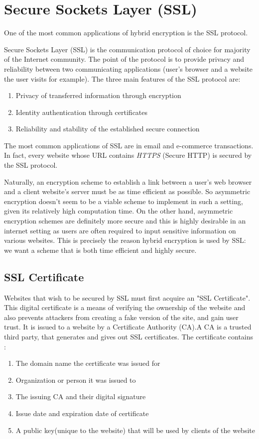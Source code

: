\section{Secure Sockets Layer (SSL)}
One of the most common applications of hybrid encryption is the SSL protocol.

\cite{mckinley}
Secure Sockets Layer (SSL) is the communication protocol of choice for majority of the Internet community. The point of the protocol is to provide privacy and reliability between two communicating applications (user's browser and a website the user visits for example). The three main features of the SSL protocol are:

\begin{enumerate}
    \item Privacy of transferred information through encryption
    \item Identity authentication through certificates
    \item Reliability and stability of the established secure connection
\end{enumerate}

The most common applications of SSL are in email and e-commerce transactions. In fact, every website whose URL contains \emph{HTTPS} (Secure HTTP) is secured by the SSL protocol.

Naturally, an encryption scheme to establish a link between a user's web browser and a client website's server must be as time efficient as possible. So asymmetric encryption doesn't seem to be a viable scheme to implement in such a setting, given its relatively high computation time. On the other hand, asymmetric encryption schemes are definitely more secure and this is highly desirable in an internet setting as users are often required to input sensitive information on various websites. This is precisely the reason hybrid encryption is used by SSL: we want a scheme that is both time efficient and highly secure.

\subsection{SSL Certificate} \cite{cloudflare_certificate}
Websites that wish to be secured by SSL must first acquire an "SSL Certificate". This digital certificate is a means of verifying the ownership of the website and also prevents attackers from creating a fake version of the site, and gain user trust. It is issued to a website by a Certificate Authority (CA).A CA is a trusted third party, that generates and gives out SSL certificates. The certificate contains :
\begin{enumerate}
    \item The domain name the certificate was issued for
    \item Organization or person it was issued to
    \item The issuing CA and their digital signature
    \item Issue date and expiration date of certificate
    \item A public key(unique to the website) that will be used by clients of the website
\end{enumerate}



